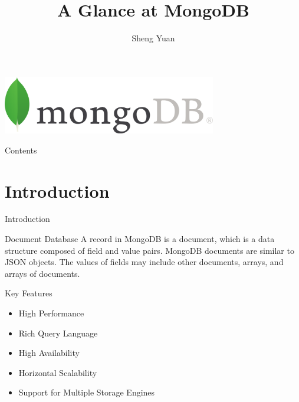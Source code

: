 \documentclass{beamer}
\title{A Glance at MongoDB}
\author{Sheng Yuan}
\begin{document}
    
\begin{frame}
	\centering\includegraphics[width=0.7\textwidth]{MongoDB-Logo.png}
    \titlepage
\end{frame}

\begin{frame}{Contents}
    \tableofcontents
\end{frame}

\section{Introduction}
\begin{frame}{Introduction}
	\begin{block}{Document Database}
		A record in MongoDB is a document, which is a data structure composed of field and value pairs. MongoDB documents are similar to JSON objects. The values of fields may include other documents, arrays, and arrays of documents.
	\end{block}
	\begin{block}{Key Features}
		\begin{itemize}
			\item High Performance
			\item Rich Query Language
			\item High Availability
			\item Horizontal Scalability
			\item Support for Multiple Storage Engines
		\end{itemize}
		
	\end{block}
    
\end{frame}
\end{document}
